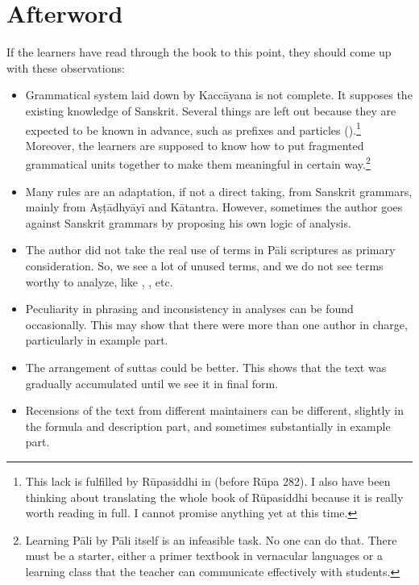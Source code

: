 \cleardoublepage
{}
{}
\chapter*{Afterword}\label{chap:afterword}

If the learners have read through the book to this point, they should come up with these observations:

\begin{itemize}
\item Grammatical system laid down by Kaccāyana is not complete. It supposes the existing knowledge of Sanskrit. Several things are left out because they are expected to be known in advance, such as prefixes and particles ().\footnote{This lack is fulfilled by Rūpasiddhi in  (before Rūpa 282). I also have been thinking about translating the whole book of Rūpasiddhi because it is really worth reading in full. I cannot promise anything yet at this time.} Moreover, the learners are supposed to know how to put fragmented grammatical units together to make them meaningful in certain way.\footnote{Learning Pāli by Pāli itself is an infeasible task. No one can do that. There must be a starter, either a primer textbook in vernacular languages or a learning class that the teacher can communicate effectively with students.}
\item Many rules are an adaptation, if not a direct taking, from Sanskrit grammars, mainly from Aṣṭādhyāyī and Kātantra. However, sometimes the author goes against Sanskrit grammars by proposing his own logic of analysis.
\item The author did not take the real use of terms in Pāli scriptures as primary consideration. So, we see a lot of unused terms, and we do not see terms worthy to analyze, like , , etc.
\item Peculiarity in phrasing and inconsistency in analyses can be found occasionally. This may show that there were more than one author in charge, particularly in example part.
\item The arrangement of suttas could be better. This shows that the text was gradually accumulated until we see it in final form.
\item Recensions of the text from different maintainers can be different, slightly in the formula and description part, and sometimes substantially in example part.
\end{itemize}

